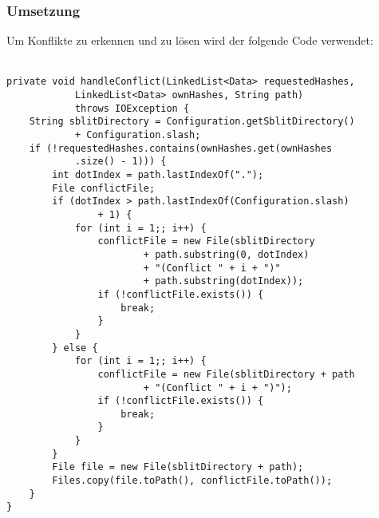 \subsubsection{Umsetzung}

Um Konflikte zu erkennen und zu lösen wird der folgende Code verwendet: \\ \\
\javalisting
\begin{minipage}{\linewidth}
\begin{lstlisting}[caption={Erkennen eines Konflikts},captionpos=b]
private void handleConflict(LinkedList<Data> requestedHashes,
			LinkedList<Data> ownHashes, String path)
			throws IOException {
	String sblitDirectory = Configuration.getSblitDirectory()
			+ Configuration.slash;
	if (!requestedHashes.contains(ownHashes.get(ownHashes
			.size() - 1))) {
		int dotIndex = path.lastIndexOf(".");
		File conflictFile;
		if (dotIndex > path.lastIndexOf(Configuration.slash) 
				+ 1) {
			for (int i = 1;; i++) {
				conflictFile = new File(sblitDirectory
						+ path.substring(0, dotIndex)
						+ "(Conflict " + i + ")"
						+ path.substring(dotIndex));
				if (!conflictFile.exists()) {
					break;
				}
			}
		} else {
			for (int i = 1;; i++) {
				conflictFile = new File(sblitDirectory + path
						+ "(Conflict " + i + ")");
				if (!conflictFile.exists()) {
					break;
				}
			}
		}
		File file = new File(sblitDirectory + path);
		Files.copy(file.toPath(), conflictFile.toPath());
	}
}
\end{lstlisting}
\end{minipage}
